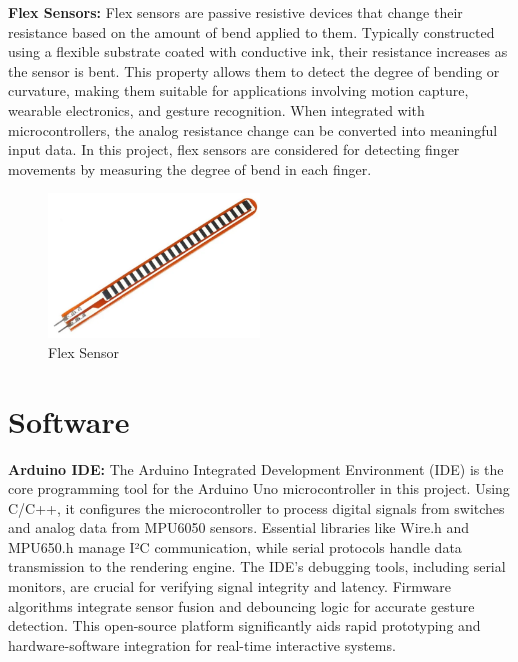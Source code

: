 \textbf{Flex Sensors: }Flex sensors are passive resistive devices that change their resistance based on the amount of bend applied to them. Typically constructed using a flexible substrate coated with conductive ink, their resistance increases as the sensor is bent. This property allows them to detect the degree of bending or curvature, making them suitable for applications involving motion capture, wearable electronics, and gesture recognition. When integrated with microcontrollers, the analog resistance change can be converted into meaningful input data. In this project, flex sensors are considered for detecting finger movements by measuring the degree of bend in each finger.

\begin{figure}[htbp!]
\centering
\includegraphics[width=0.5\textwidth]{images/3.4.png}
\caption{Flex Sensor}
\label{fig:3.4}
\end{figure}


\section{Software}

\textbf{Arduino IDE:} The Arduino Integrated Development Environment (IDE) is the core programming tool for the Arduino Uno microcontroller in this project. Using C/C++, it configures the microcontroller to process digital signals from switches and analog data from MPU6050 sensors. Essential libraries like Wire.h and MPU650.h manage I²C communication, while serial protocols handle data transmission to the rendering engine. The IDE's debugging tools, including serial monitors, are crucial for verifying signal integrity and latency. Firmware algorithms integrate sensor fusion and debouncing logic for accurate gesture detection. This open-source platform significantly aids rapid prototyping and hardware-software integration for real-time interactive systems.

